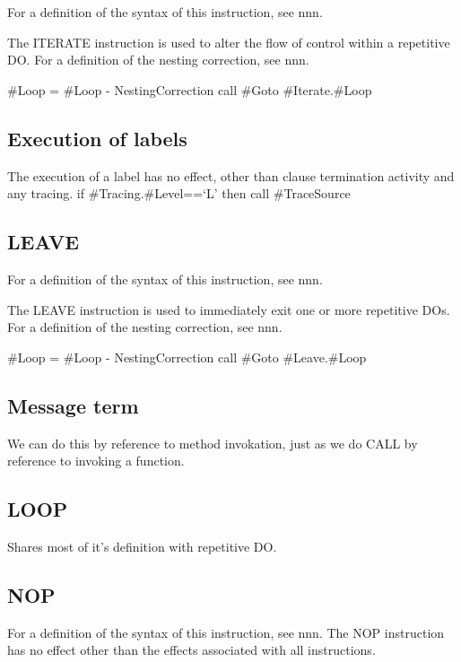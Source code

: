 For a definition of the syntax of this instruction, see nnn.

The ITERATE instruction is used to alter the flow of control within a
repetitive DO. For a definition of the nesting correction, see nnn.

\#Loop = \#Loop - NestingCorrection call \#Goto \#Iterate.\#Loop

\hypertarget{execution-of-labels}{%
\subsection{Execution of labels}\label{execution-of-labels}}

The execution of a label has no effect, other than clause termination
activity and any tracing. if \#Tracing.\#Level==`L' then call
\#TraceSource

\hypertarget{leave}{%
\subsection{LEAVE}\label{leave}}

For a definition of the syntax of this instruction, see nnn.

The LEAVE instruction is used to immediately exit one or more repetitive
DOs. For a definition of the nesting correction, see nnn.

\#Loop = \#Loop - NestingCorrection call \#Goto \#Leave.\#Loop

\hypertarget{message-term}{%
\subsection{Message term}\label{message-term}}

We can do this by reference to method invokation, just as we do CALL by
reference to invoking a function.

\hypertarget{loop}{%
\subsection{LOOP}\label{loop}}

Shares most of it's definition with repetitive DO.

\hypertarget{nop}{%
\subsection{NOP}\label{nop}}

For a definition of the syntax of this instruction, see nnn. The NOP
instruction has no effect other than the effects associated with all
instructions.

